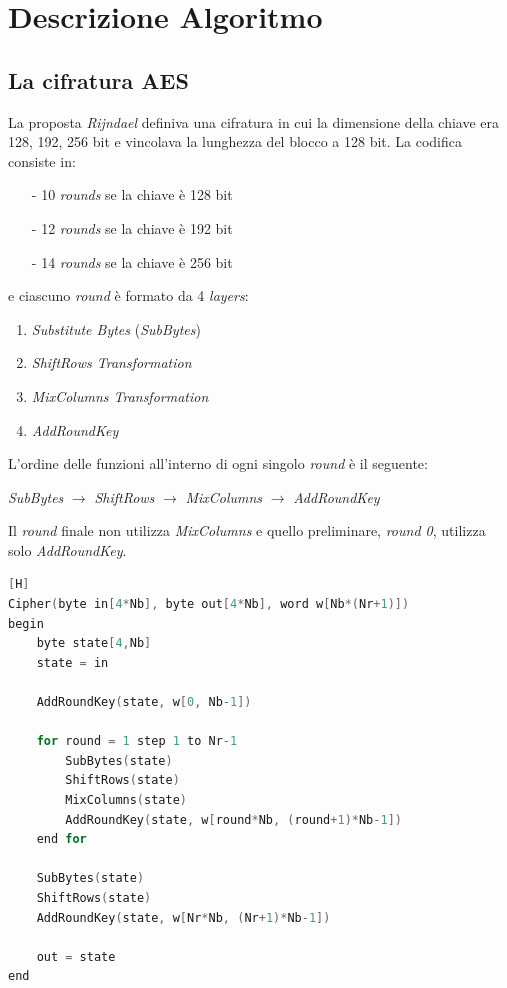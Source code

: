 \documentclass[a4paper,11pt]{article}
\begin{document}
\section{Descrizione Algoritmo}
\subsection{La cifratura AES}
La proposta \textit{Rijndael} definiva una cifratura in cui la dimensione della chiave era 128, 192, 256 bit e vincolava la lunghezza del blocco a 128 bit.
\bigbreak
\noindent La codifica consiste in:
\begin{itemize}
    \item[-] 10 \textit{rounds} se la chiave è 128 bit
    \item[-] 12 \textit{rounds} se la chiave è 192 bit
    \item[-] 14 \textit{rounds} se la chiave è 256 bit
\end{itemize}
e ciascuno \textit{round} è formato da 4 \textit{layers}:
\begin{enumerate}
    \item \textit{Substitute Bytes} (\textit{SubBytes})
    \item \textit{ShiftRows Transformation}
    \item \textit{MixColumns Transformation}
    \item \textit{AddRoundKey}
\end{enumerate}

L'ordine delle funzioni all'interno di ogni singolo \textit{round} è il seguente:
\begin{center}
    \textit{SubBytes} $\rightarrow$ \textit{ShiftRows} $\rightarrow$ \textit{MixColumns} $\rightarrow$ \textit{AddRoundKey}
\end{center}
Il \textit{round} finale non utilizza \textit{MixColumns} e quello preliminare, \textit{round 0}, utilizza solo \textit{AddRoundKey}.

\begin{lstlisting}[language=c, frame=single, caption={Pseudo code for Chiper}][H]
Cipher(byte in[4*Nb], byte out[4*Nb], word w[Nb*(Nr+1)])
begin
    byte state[4,Nb]
    state = in

    AddRoundKey(state, w[0, Nb-1])

    for round = 1 step 1 to Nr-1
        SubBytes(state)
        ShiftRows(state)
        MixColumns(state)
        AddRoundKey(state, w[round*Nb, (round+1)*Nb-1])
    end for
    
    SubBytes(state)
    ShiftRows(state)
    AddRoundKey(state, w[Nr*Nb, (Nr+1)*Nb-1])

    out = state
end
\end{lstlisting}
\end{document}
